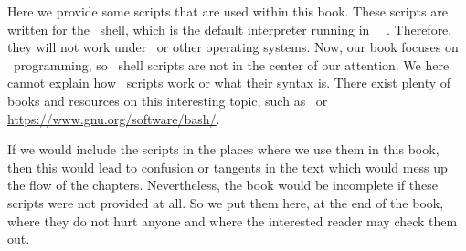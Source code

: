 %
%
%
%
%
%
%
%
%
%
%
%
Here we provide some scripts that are used within this book.
These scripts are written for the \bash\ shell, which is the default interpreter running in \ubuntu\ \linux\ .
Therefore, they will not work under \windows\ or other operating systems.
Now, our book focuses on \python\ programming, so \bash\ shell scripts are not in the center of our attention.
We here cannot explain how \bash\ scripts work or what their syntax is.
There exist plenty of books and resources on this interesting topic, such as~\cite{NR2005LTBSUSPCB3,Z2017MB,BN2018BC} or \url{https://www.gnu.org/software/bash/}.

If we would include the scripts in the places where we use them in this book, then this would lead to confusion or tangents in the text which would mess up the flow of the chapters.
Nevertheless, the book would be incomplete if these scripts were not provided at all.
So we put them here, at the end of the book, where they do not hurt anyone and where the interested reader may check them out.

